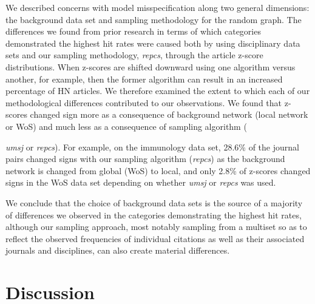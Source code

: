 \documentclass[NETN]{stjour}
\begin{document}
We described concerns with model misspecification along two general dimensions: the background data set and sampling methodology for the random graph. The differences we found from prior research in terms of which categories demonstrated the highest hit rates were caused both by using disciplinary data sets and our sampling methodology, \textit{repcs},  through the article z-score distributions. 
When z-scores are shifted downward using one algorithm versus another, for example, then the former algorithm can result in an increased percentage of HN articles.
We therefore examined  the extent to which each of our methodological differences contributed to our observations.  
We found that z-scores changed sign more as a consequence of background network (local network or WoS) and much less as a consequence of sampling algorithm
 ({\textit{umsj} or \textit{repcs}). 
For example,  on the immunology data set, 28.6\% of the journal pairs changed signs with our sampling algorithm (\textit{repcs}) as the background network is changed from global (WoS) to local, and 
only 2.8\% of z-scores changed signs in the WoS data set depending on whether 
\textit{umsj} or \textit{repcs} was used. 

We conclude that the choice of background data sets is the source of a majority of differences we observed in the categories demonstrating the highest hit rates, although our sampling approach, most notably sampling from a multiset so as to reflect the observed frequencies of individual citations as well as their associated journals and disciplines, can also create material differences.  

\section{Discussion}

}
\end{document}
